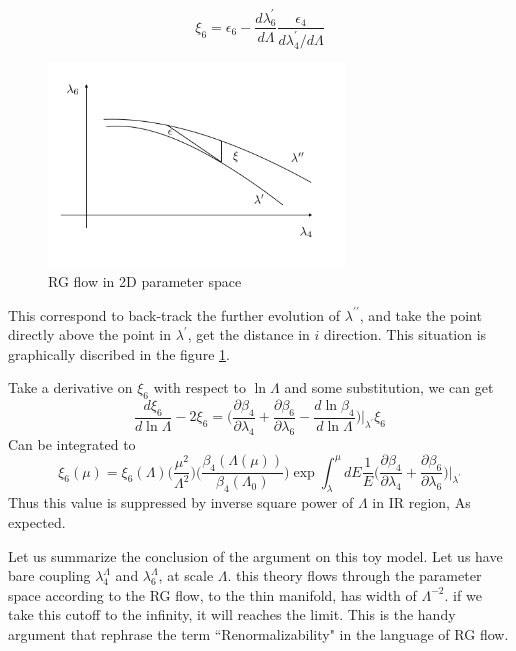 \documentclass[12pt,halfline,a4paper]{ouparticle}
\begin{document}
\begin{equation}
	\label{xi6}
	\xi_6=\epsilon_6-\frac{d\lambda^\prime_6}{d\Lambda}\frac{\epsilon_4}{d\lambda^\prime_4/d\Lambda}
\end{equation}
\begin{figure}
	\centering
	\includegraphics[width=0.7\textwidth]{Fig1.jpeg}
	\caption{RG flow in 2D parameter space}
	\label{fig:RGflow}
\end{figure}
This correspond to back-track the further evolution of $\lambda^{\prime\prime}$, and take the point directly above the point in $\lambda^\prime$, get the distance in $i$ direction.
This situation is graphically discribed in the figure \ref{fig:RGflow}.

	
Take a derivative on $\xi_6$ with respect to $\ln\Lambda$ and some substitution, we can get
\begin{equation}
	\label{eq:xi6}
	\frac{d\xi_6}{d\ln\Lambda}-2\xi_6=\bigg(\frac{\partial\beta_4}{\partial\lambda_4}+\frac{\partial\beta_6}{\partial\lambda_6}-\frac{d\ln\beta_4}{d\ln\Lambda}\bigg)\bigg\lvert_{\lambda^\prime}\xi_6
\end{equation}
Can be integrated to
\begin{equation}
	\xi_6(\mu) = \xi_6(\Lambda)\bigg(\frac{\mu^2}{\Lambda^2}\bigg)\bigg(\frac{\beta_4(\Lambda(\mu))}{\beta_4(\Lambda_0)}\bigg)\exp\int^\mu_\lambda dE\frac{1}{E}\bigg(\frac{\partial\beta_4}{\partial\lambda_4}+\frac{\partial\beta_6}{\partial\lambda_6}\bigg)\bigg\lvert_{\lambda^\prime}
\end{equation}
Thus this value is suppressed by inverse square power of $\Lambda$ in IR region, As expected.

Let us summarize the conclusion of the argument on this toy model. Let us have bare coupling $\lambda_4^\Lambda$ and $\lambda_6^\Lambda$, at scale $\Lambda$. this theory flows through the parameter space according to the RG flow,
to the thin manifold, has width of $\Lambda^{-2}$. if we take this cutoff to the infinity, it will reaches the limit. This is the handy argument that rephrase the term ``Renormalizability" in the language of RG flow.
\end{document}
